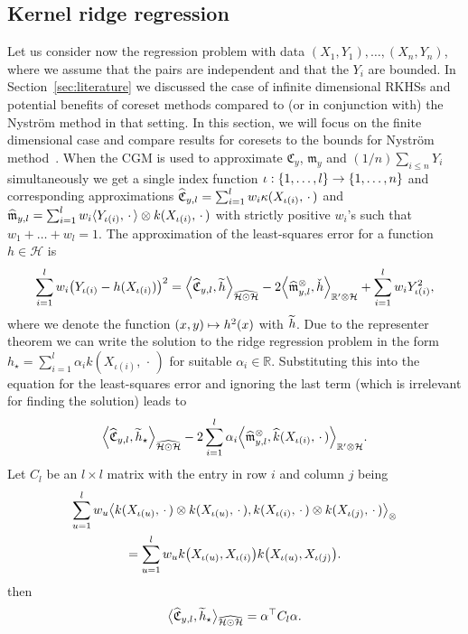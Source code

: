 \documentclass[AHL,Unicode,longabstracts,published]{cedram}
\theoremstyle{remark}
\newcommand{\R}{\mathbb{R}}
\newcommand{\dR}{{\R'}}
\newcommand{\cH}{\mathcal{H}}
\newcommand{\fkC}{\mathfrak{C}}
\newcommand{\mean}{\mathfrak{m}}
\let\oldtilde\tilde
\renewcommand*{\tilde}[1]{\mathchoice{\widetilde{#1}}{\widetilde{#1}}{\oldtilde{#1}}{\oldtilde{#1}}}
\let\oldhat\hat
\renewcommand*{\hat}[1]{\mathchoice{\widehat{#1}}{\widehat{#1}}{\oldhat{#1}}{\oldhat{#1}}}
\renewcommand*{\to}{\mathchoice{\longrightarrow}{\rightarrow}{\rightarrow}{\rightarrow}}
\let\oldmapsto\mapsto
\renewcommand*{\mapsto}{\mathchoice{\longmapsto}{\oldmapsto}{\oldmapsto}{\oldmapsto}}
\let\originalleft\left
\let\originalright\right
\renewcommand{\left}{\mathopen{}\mathclose\bgroup\originalleft}
\renewcommand{\right}{\aftergroup\egroup\originalright}
\begin{document}
\subsection{Kernel ridge regression} Let us consider now the regression problem with data $(X_1,Y_1), \dots, (X_n,Y_n)$, where we assume that the pairs are independent and that the $Y_i$ are bounded. In Section~\ref{sec:literature} we discussed the case of infinite dimensional RKHSs and potential benefits of coreset methods compared to (or in conjunction with) the Nystr\"om method in that setting. In this section, we will focus on the finite dimensional case and compare results for coresets to the bounds for Nystr\"om method~\cite{LI23}. When the CGM is used to approximate $\fkC_y$, $\mean_y$ and $(1/n) \sum_{i\leq n} Y_i$ simultaneously we get a single index function $\iota:\{1,\dots,l\} \to \{1,\dots,n\}$ and corresponding approximations $\hat{\fkC}_{y,l} = \sum_{i=1}^l w_i \kappa(X_{\iota(i)}, \,\cdot\,)$ and $\hat{\mean}_{y,l} = \sum_{i=1}^l w_i \langle Y_{\iota(i)}, \,\cdot\,\rangle \otimes k(X_{\iota(i)},\,\cdot\,)$ with strictly positive $w_i$'s such that $w_1+\dots + w_l = 1$. The approximation of the least-squares error for a function $h \in \cH$ is
\begin{align*}
\sum_{i=1}^l w_i \left(Y_{\iota(i)} - h(X_{\iota(i)})\right)^2 = \left\langle \hat{\fkC}_{y,l}, \tilde h \right\rangle_{\widehat{\cH \odot \cH}} - 2 \left\langle \hat \mean^{\otimes}_{y,l}, \check{h} \right\rangle_{\dR \otimes \cH} + \sum_{i=1}^l w_i Y_{\iota(i)}^2,
\end{align*}
where we denote the function $(x,y) \mapsto h^2(x)$ with $\tilde h$. Due to the representer theorem we can write the solution to the ridge regression problem in the form $h_\star = \sum_{i=1}^l \alpha_i k(X_{\iota(i)}, \,\cdot\,)$ for suitable $\alpha_i \in \R$. Substituting this into the equation for the least-squares error and ignoring the last term (which is irrelevant for finding the solution) leads to
\begin{align*}
\left\langle \hat{\fkC}_{y,l}, \tilde{h}_\star \right\rangle_{\widehat{\cH \odot \cH}} - 2 \sum_{i=1}^l \alpha_i \left\langle \hat{\mean}^\otimes_{y,l}, \hat k(X_{\iota(i)},\,\cdot\,) \right\rangle_{\dR \otimes \cH}.
\end{align*}
Let $C_l$ be an $l\times l$ matrix with the entry in row $i$ and column $j$ being
\begin{multline*}
\sum_{u=1}^l w_u \bigl\langle k(X_{\iota(u)},\,\cdot\,)\otimes k(X_{\iota(u)},\,\cdot\,),k(X_{\iota(i)},\,\cdot\,)\otimes k(X_{\iota(j)},\,\cdot\,) \bigr\rangle_\otimes \\
= \sum_{u=1}^l w_u k\left(X_{\iota(u)},X_{\iota(i)}\right) k\left(X_{\iota(u)},X_{\iota(j)}\right).
\end{multline*}
then
\[
\bigl\langle \hat{\fkC}_{y,l}, \tilde{h}_\star \bigr\rangle_{\widehat{\cH \odot \cH}} = \alpha^\top C_l \alpha.
\]
\end{document}
